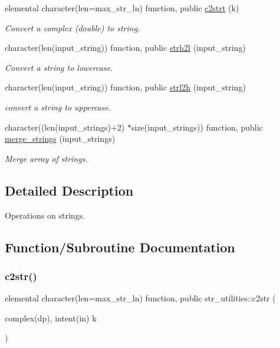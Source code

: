 \begin{DoxyCompactItemize}
elemental character(len=max\+\_\+str\+\_\+ln) function, public \hyperlink{namespacestr__utilities_abca28d6272d447dc1c0c100624c6ed75}{c2strt} (k)
\begin{DoxyCompactList}\small\item\em Convert a complex (double) to string. \end{DoxyCompactList}\item 
character(len(input\+\_\+string)) function, public \hyperlink{namespacestr__utilities_a219964a283968cc6a968db0197d2187e}{strh2l} (input\+\_\+string)
\begin{DoxyCompactList}\small\item\em Convert a string to lowercase. \end{DoxyCompactList}\item 
character(len(input\+\_\+string)) function, public \hyperlink{namespacestr__utilities_a7e2e441d509c12045a3373819040a806}{strl2h} (input\+\_\+string)
\begin{DoxyCompactList}\small\item\em convert a string to uppercase. \end{DoxyCompactList}\item 
character((len(input\+\_\+strings)+2) $\ast$size(input\+\_\+strings)) function, public \hyperlink{namespacestr__utilities_a6ab16f33c155db79844279c6a56a494c}{merge\+\_\+strings} (input\+\_\+strings)
\begin{DoxyCompactList}\small\item\em Merge array of strings. \end{DoxyCompactList}\end{DoxyCompactItemize}


\subsection{Detailed Description}
Operations on strings. 

\subsection{Function/\+Subroutine Documentation}
\mbox{\label{namespacestr__utilities_a308e943e5e244e3e0f852f2ecb3e3183}} 
\subsubsection{\texorpdfstring{c2str()}{c2str()}}
{\footnotesize\ttfamily elemental character(len=max\+\_\+str\+\_\+ln) function, public str\+\_\+utilities\+::c2str (\begin{DoxyParamCaption}\item[{complex(dp), intent(in)}]{k }\end{DoxyParamCaption})}



